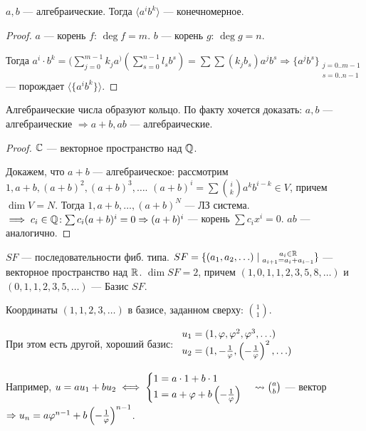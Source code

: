 \begin{statement}
    $a, b$ --- алгебраические. Тогда  $\langle a^i b^k \rangle$ --- конечномерное. 
\end{statement}
\begin{proof}
    $a$ --- корень  $f$:  $\deg f = m$.  $b$ --- корень  $g$:  $\deg g = n$.
    
    Тогда  $a^i \cdot b^k = (\sum\limits_{j=0}^{m-1} k_j a^)(\sum\limits_{s=0}^{n-1} l_s b^s) = \sum \sum (k_j b_s)a^j b^s \Rightarrow \{ a^j b^s\}_{\substack{j = 0..m-1 \\ s = 0..n-1}}$ --- порождает  $\langle \{a^i b^k\} \rangle$.
\end{proof}
\begin{theorem}
    Алгебраические числа образуют кольцо. По факту хочется доказать: $a, b$ --- алгебраические  $\Rightarrow a + b, ab$ --- алгебраические.
\end{theorem}
\begin{proof}
    $\mathbb{C}$ --- векторное пространство над  $\mathbb{Q}$. 

    Докажем, что $a+b$ --- алгебраическое: рассмотрим  $1, a+b, (a+b)^2, (a+b)^3, \ldots$. $(a+b)^i = \sum \binom{i}{k} a^k b^{i-k} \in V$, причем  $\dim V = N$. Тогда  $1, a+b, \ldots, (a+b)^N$ --- ЛЗ система. $\implies c_i \in \mathbb{Q}\!: \sum c_i(a+b)^i = 0 \Rightarrow (a+b)^i$ --- корень  $\sum c_i x^i = 0$.  $ab$ --- аналогично.
\end{proof}

\begin{example}
    $SF$ --- последовательности фиб. типа.  $SF = \{ (a_1, a_2, \ldots) \mid \substack{a_i \in \mathbb{R} \\ a_{i+1} = a_i + a_{i-1}} \} $ --- векторное пространство над $\mathbb{R}$.  $\dim SF = 2$, причем  $(1, 0, 1, 1, 2, 3, 5, 8, \ldots)$ и $(0, 1, 1, 2, 3, 5, \ldots)$ --- Базис $SF$. 

    Координаты  $(1, 1, 2, 3, \ldots)$ в базисе, заданном сверху: $\binom{1}{1}$. 

    При этом есть другой, хороший базис:  $\begin{array}{l} u_1 = (1, \varphi, \varphi^2, \varphi^3, \ldots) \\ u_2 =(1, -\frac{1}{\varphi}, \left(-\frac{1}{\varphi}\right)^2, \ldots ) \end{array}$

    Например, $u = au_1 + bu_2 \iff \begin{cases} 1 = a\cdot 1 + b\cdot1 \\ 1 = a + \varphi  + b \left(-\frac{1}{\varphi}\right) \end{cases} \leadsto \binom{a}{b}$ --- вектор $\Rightarrow u_n = a \varphi^{n-1} + b \left(-\frac{1}{\varphi}\right)^{n-1}$. 
\end{example}


